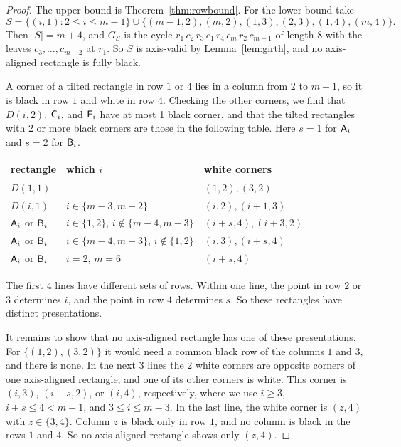\begin{proof}
The upper bound is Theorem~\ref{thm:rowbound}. For the lower bound take
\[
S=\{(i,1):2\le i\le m-1\}\cup\{(m-1,2),(m,2),(1,3),(2,3),(1,4),(m,4)\}.
\]
Then $|S|=m+4$, and $G_S$ is the cycle $r_1\,c_2\,r_3\,c_1\,r_4\,c_m\,r_2\,c_{m-1}$ of
length $8$ with the leaves $c_3,\dots,c_{m-2}$ at $r_1$. So $S$ is axis-valid by
Lemma~\ref{lem:girth}, and no axis-aligned rectangle is fully black.

A corner of a tilted rectangle in row $1$ or $4$ lies in a column from $2$ to $m-1$, so it
is black in row $1$ and white in row $4$. Checking the other corners, we find that $D(i,2)$, $\mathsf{C}_i$, and $\mathsf{E}_i$ have at most 1 black corner, and that the tilted
rectangles with 2 or more black corners are those in the following table. Here $s=1$ for
$\mathsf{A}_i$ and $s=2$ for $\mathsf{B}_i$.
\begin{center}\small
\begin{tabular}{@{}lll@{}}
\toprule
rectangle & which $i$ & white corners\\
\midrule
$D(1,1)$ & & $(1,2),(3,2)$\\
$D(i,1)$ & $i\in\{m-3,m-2\}$ & $(i,2),(i+1,3)$\\
$\mathsf{A}_i$ or $\mathsf{B}_i$ & $i\in\{1,2\}$, $i\notin\{m-4,m-3\}$ & $(i+s,4),(i+3,2)$\\
$\mathsf{A}_i$ or $\mathsf{B}_i$ & $i\in\{m-4,m-3\}$, $i\notin\{1,2\}$ & $(i,3),(i+s,4)$\\
$\mathsf{A}_i$ or $\mathsf{B}_i$ & $i=2$, $m=6$ & $(i+s,4)$\\
\bottomrule
\end{tabular}
\end{center}
The first 4 lines have different sets of rows. Within one line, the point in row $2$ or
$3$ determines $i$, and the point in row $4$ determines $s$. So these rectangles have
distinct presentations.

It remains to show that no axis-aligned rectangle has one of these presentations. For
$\{(1,2),(3,2)\}$ it would need a common black row of the columns $1$ and $3$, and there is
none. In the next 3 lines the 2 white corners are opposite corners of one axis-aligned
rectangle, and one of its other corners is white. This corner is $(i,3)$, $(i+s,2)$, or
$(i,4)$, respectively, where we use $i\ge3$, $i+s\le4<m-1$, and $3\le i\le m-3$. In the
last line, the white corner is $(z,4)$ with $z\in\{3,4\}$. Column $z$ is black only in row
$1$, and no column is black in the rows $1$ and $4$. So no axis-aligned rectangle shows
only $(z,4)$.
\end{proof}

